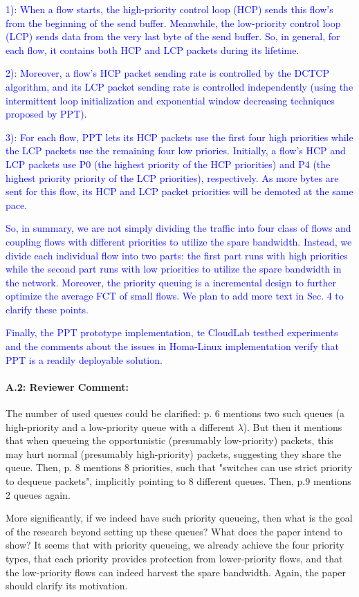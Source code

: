 \documentclass[12pt,one-column]{article}
\begin{document}
\textcolor{blue}{1): When a flow starts, the high-priority control loop (HCP) sends this flow's from the beginning of the send buffer. Meanwhile, the low-priority control loop (LCP) sends data from the very last byte of the send buffer. So, in general, for each flow, it contains both HCP and LCP packets during its lifetime. }

\textcolor{blue}{2): Moreover, a flow's HCP packet sending rate is controlled by the DCTCP algorithm, and its LCP packet sending rate is controlled independently (using the intermittent loop initialization and exponential window decreasing techniques proposed by PPT). 
}

\textcolor{blue}{3): For each flow, PPT lets its HCP packets use the first four high priorities while the LCP packets use the remaining four low priories. Initially, a flow's HCP and LCP packets use  P0 (the highest priority of the HCP priorities) and P4 (the highest priority priority of the LCP priorities), respectively. As more bytes are sent for this flow, its HCP and LCP packet priorities will be demoted at the same pace.
}

\textcolor{blue}{So, in summary, we are not simply dividing the traffic into four class of flows and coupling flows with different priorities to utilize the spare bandwidth. Instead, we divide each individual flow into two parts: the first part runs with high priorities while the second part runs with low priorities to utilize the spare bandwidth in the network. Moreover, the priority queuing is a incremental design to further optimize the average FCT of small flows. We plan to add more text in Sec. 4 to clarify these points.
}

\textcolor{blue}{Finally, the PPT prototype implementation, te CloudLab testbed experiments and the comments about the issues in Homa-Linux implementation verify that PPT is a readily deployable solution.
}


{\it \paragraph{A.2: Reviewer Comment:} The number of used queues could be clarified: p. 6 mentions two such queues (a high-priority and a low-priority queue with a different $\lambda$). But then it mentions that when queueing the opportunistic (presumably low-priority) packets, this may hurt normal (presumably high-priority) packets, suggesting they share the queue. Then, p. 8 mentions 8 priorities, such that "switches can use strict priority to dequeue packets", implicitly pointing to 8 different queues. Then, p.9 mentions 2 queues again.
	
More significantly, if we indeed have such priority queueing, then what is the goal of the research beyond setting up these queues? What does the paper intend to show? It seems that with priority queueing, we already achieve the four priority types, that each priority provides protection from lower-priority flows, and that the low-priority flows can indeed harvest the spare bandwidth. Again, the paper should clarify its motivation.}
\end{document}
